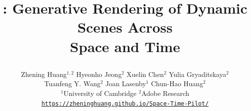 \documentclass[10pt,twocolumn,letterpaper]{article}
\title{\logo \space \nameMethod: Generative Rendering of Dynamic Scenes Across \\  Space and Time

}
\author{
Zhening Huang$^{1,2}$ \quad 
Hyeonho Jeong$^2$ \quad 
Xuelin Chen$^2$ \quad 
Yulia Gryaditskaya$^2$ \\
Tuanfeng Y. Wang$^2$ \quad
Joan Lasenby$^1$ \quad 
Chun-Hao Huang$^2$ \\[1.5ex]
$^1$University of Cambridge \qquad $^2$Adobe Research \\[1.5ex]
\texttt{\url{https://zheninghuang.github.io/Space-Time-Pilot/}} 
}
\begin{document}


    






{
    \small
    
    
}


\end{document}
